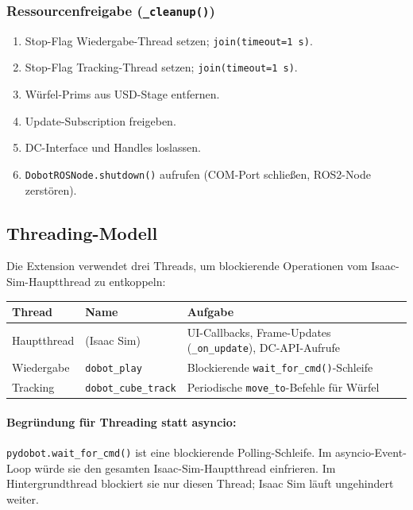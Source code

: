 \documentclass[11pt,a4paper]{article}
\begin{document}
\subsubsection{Ressourcenfreigabe (\texttt{\_cleanup()})}

\begin{enumerate}
  \item Stop-Flag Wiedergabe-Thread setzen;
        \texttt{join(timeout=1\,s)}.
  \item Stop-Flag Tracking-Thread setzen;
        \texttt{join(timeout=1\,s)}.
  \item Würfel-Prims aus USD-Stage entfernen.
  \item Update-Subscription freigeben.
  \item DC-Interface und Handles loslassen.
  \item \texttt{DobotROSNode.shutdown()} aufrufen
        (COM-Port schließen, ROS2-Node zerstören).
\end{enumerate}

\subsection{Threading-Modell}
\label{sec:threading}

Die Extension verwendet drei Threads, um blockierende Operationen
vom Isaac-Sim-Hauptthread zu entkoppeln:

\begin{center}
\begin{tabular}{llp{7cm}}
  \toprule
  Thread & Name & Aufgabe \\
  \midrule
  Hauptthread & (Isaac Sim) & UI-Callbacks, Frame-Updates
                (\texttt{\_on\_update}), DC-API-Aufrufe \\
  Wiedergabe & \texttt{dobot\_play} & Blockierende
                \texttt{wait\_for\_cmd()}-Schleife \\
  Tracking & \texttt{dobot\_cube\_track} & Periodische
                \texttt{move\_to}-Befehle für Würfel \\
  \bottomrule
\end{tabular}
\end{center}

\paragraph{Begründung für Threading statt asyncio:}
\texttt{pydobot.wait\_for\_cmd()} ist eine blockierende
Polling-Schleife. Im asyncio-Event-Loop würde sie den gesamten
Isaac-Sim-Hauptthread einfrieren. Im Hintergrundthread blockiert
sie nur diesen Thread; Isaac Sim läuft ungehindert weiter.
\end{document}
